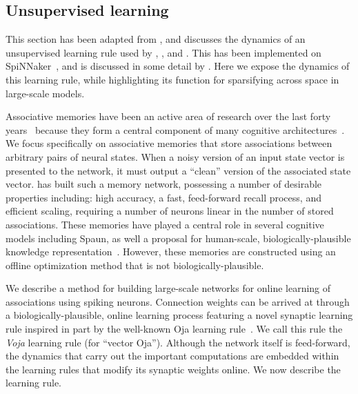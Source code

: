\subsection{Unsupervised learning}
\label{sec:unsupervised}

This section has been adapted from \citet{voelker2014a}, and discusses the dynamics of an unsupervised learning rule used by \citet{voelker2014controlling}, \citet{trujillo2014a}, and \citet{aubin2016a}.
This has been implemented on SpiNNaker~\citep{knight2016}, and is discussed in some detail by \citet{aubin2018}.
Here we expose the dynamics of this learning rule, while highlighting its function for sparsifying across space in large-scale models.

Associative memories have been an active area of research over the last forty years~\citep{willshaw1969nonholographic, kohonen1972, hopfield1982} because they form a central component of many cognitive architectures~\citep{Pollack1988, Anderson1998}.
We focus specifically on associative memories that store associations between arbitrary pairs of neural states.
When a noisy version of an input state vector is presented to the network, it must output a ``clean'' version of the associated state vector.
\citet{stewart2011biologically} has built such a memory network, possessing a number of desirable properties including: high accuracy, a fast, feed-forward recall process, and efficient scaling, requiring a number of neurons linear in the number of stored associations.
 These memories have played a central role in several cognitive models including Spaun, as well a proposal for human-scale, biologically-plausible knowledge representation~\citep{crawford2015}.
However, these memories are constructed using an offline optimization method that is not biologically-plausible.

We describe a method for building large-scale networks for online learning of associations using spiking neurons.
Connection weights can be arrived at through a biologically-plausible, online learning process featuring a novel synaptic learning rule inspired in part by the well-known Oja learning rule~\citep{oja1989neural}.
We call this rule the \emph{Voja} learning rule (for ``vector Oja'').
Although the network itself is feed-forward, the dynamics that carry out the important computations are embedded within the learning rules that modify its synaptic weights online.
We now describe the learning rule.

